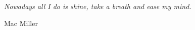 \begingroup
  \let\clearpage\relax
  \vfill
  \begin{flushright}
    \textit{Nowadays all I do is shine, take a breath and ease my mind.}
    \par
    \vspace{0.5cm}
    Mac Miller
  \end{flushright}
\endgroup